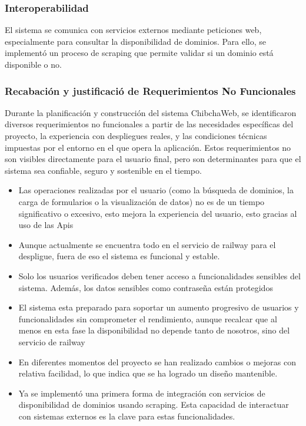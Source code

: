 \subsubsection{Interoperabilidad}

El sistema se comunica con servicios externos mediante peticiones web, especialmente para consultar la disponibilidad de dominios. Para ello, se implementó un proceso de scraping que permite validar si un dominio está disponible o no.


\subsubsection{Recabación y justificació de Requerimientos No Funcionales}
Durante la planificación y construcción del sistema ChibchaWeb, se identificaron diversos requerimientos no funcionales a partir de las necesidades específicas del proyecto, la experiencia con despliegues reales, y las condiciones técnicas impuestas por el entorno en el que opera la aplicación. Estos requerimientos no son visibles directamente para el usuario final, pero son determinantes para que el sistema sea confiable, seguro y sostenible en el tiempo.

\begin{itemize}
    \item {Las operaciones realizadas por el usuario (como la búsqueda de dominios, la carga de formularios o la visualización de datos) no es de un tiempo significativo o excesivo, esto mejora la experiencia del usuario, esto gracias al uso de las Apis }
    \item {Aunque actualmente se encuentra todo en el servicio de railway para el despligue, fuera de eso el sistema es funcional y estable. }
    \item {Solo los usuarios verificados deben tener acceso a funcionalidades sensibles del sistema. Además, los datos sensibles  como contraseña están protegidos  }
    \item {El sistema esta preparado para soportar un aumento progresivo de usuarios y funcionalidades sin comprometer el rendimiento, aunque recalcar que al menos en esta fase la disponibilidad no depende tanto de nosotros, sino del servicio de railway }
    \item {En diferentes momentos del proyecto se han realizado cambios o mejoras con relativa facilidad, lo que indica que se ha logrado un diseño mantenible. }
    \item {Ya se implementó una primera forma de integración con servicios de disponibilidad de dominios usando scraping. Esta capacidad de interactuar con sistemas externos es la clave para estas funcionalidades. }
\end{itemize}

